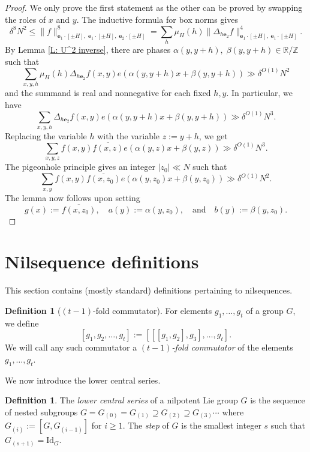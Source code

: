 \documentclass[11pt]{amsart}
\theoremstyle{definition}
\newtheorem{definition}[lemma]{Definition}
\newcommand{\be}{{\mathbf{e}}}
\begin{document}
\begin{proof}
We only prove the first statement as the other can be proved by swapping the roles of $x$ and $y$.  The inductive formula for box norms gives
$$\delta^{8} N^2 \leq \|f\|_{\be_1\cdot[\pm H],\; \be_1\cdot[\pm H],\; \be_2\cdot[\pm H]}^8=\sum_h \mu_H(h) \|\Delta_{h\be_2}f\|_{\be_1\cdot[\pm H],\; \be_1\cdot[\pm H]}^4.$$
By Lemma \ref{L: U^2 inverse}, there are phases $\alpha(y,y+h),\; \beta(y,y+h) \in \mathbb{R}/\mathbb{Z}$ such that
$$\sum_{x,y,h} \mu_H(h)\Delta_{h\be_2} f(x,y)e(\alpha(y,y+h)x+\beta(y,y+h)) \gg \delta^{O(1)}N^2$$
and the summand is real and nonnegative for each fixed $h,y$.  In particular, we have
$$\sum_{x,y, h}\Delta_{h\be_2} f(x,y) e(\alpha(y,y+h)x+\beta(y,y+h)) \gg \delta^{O(1)}N^3.$$
Replacing the variable $h$ with the variable $z:=y+h$, we get
$$\sum_{x,y,z}f(x,y)\overline{f(x,z)} e(\alpha(y,z)x+\beta(y,z)) \gg \delta^{O(1)}N^3.$$
The pigeonhole principle gives an integer $|z_0| \ll N$ such that
$$\sum_{x,y}f(x,y)\overline{f(x,z_0)} e(\alpha(y,z_0)x+\beta(y,z_0)) \gg \delta^{O(1)}N^2.$$
The lemma now follows upon setting 
$$g(x):=\overline{f(x,z_0)}, \quad a(y):=\alpha(y,z_0), \quad \text{and} \quad b(y):=\beta(y,z_0).$$
\end{proof}





\section{Nilsequence definitions}\label{A: nilsequence theory}

This section contains (mostly standard) definitions pertaining to nilsequences.

\begin{definition}[$(t - 1)$-fold commutator]
    For elements $g_1, \dots, g_t$ of a group $G$, we define
    $$[g_1, g_2, \dots, g_t] := [[[g_1, g_2], g_3], \dots, g_t].$$
    We will call any such commutator a \emph{$(t - 1)$-fold commutator} of the elements $g_1, \dots, g_t$.
\end{definition}

We now introduce the lower central series.
\begin{definition}\label{d:lowercentraseries}
The \emph{lower central series} of a nilpotent Lie group $G$ is the sequence of nested subgroups $G=G_{(0)}=G_{(1)} \supseteq G_{(2)} \supseteq G_{(3)} \cdots $ where $G_{(i)} := [G, G_{(i - 1)}]$ for $i \geq 1$.  The \textit{step} of $G$ is the smallest integer $s$ such that $G_{(s + 1)} = \mathrm{Id}_G$.
\end{definition}
\end{document}
